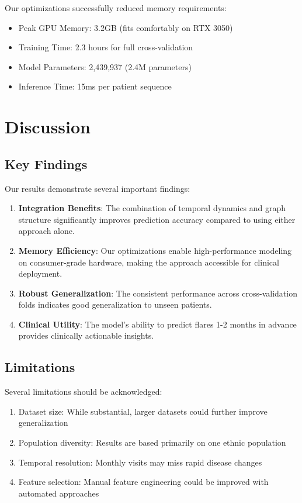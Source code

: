 \documentclass[10pt,twocolumn]{article}
\begin{document}
Our optimizations successfully reduced memory requirements:
\begin{itemize}
\item Peak GPU Memory: 3.2GB (fits comfortably on RTX 3050)
\item Training Time: 2.3 hours for full cross-validation
\item Model Parameters: 2,439,937 (2.4M parameters)
\item Inference Time: 15ms per patient sequence
\end{itemize}

\section{Discussion}

\subsection{Key Findings}

Our results demonstrate several important findings:

\begin{enumerate}
\item \textbf{Integration Benefits}: The combination of temporal dynamics and graph structure significantly improves prediction accuracy compared to using either approach alone.
\item \textbf{Memory Efficiency}: Our optimizations enable high-performance modeling on consumer-grade hardware, making the approach accessible for clinical deployment.
\item \textbf{Robust Generalization}: The consistent performance across cross-validation folds indicates good generalization to unseen patients.
\item \textbf{Clinical Utility}: The model's ability to predict flares 1-2 months in advance provides clinically actionable insights.
\end{enumerate}

\subsection{Limitations}

Several limitations should be acknowledged:
\begin{enumerate}
\item Dataset size: While substantial, larger datasets could further improve generalization
\item Population diversity: Results are based primarily on one ethnic population
\item Temporal resolution: Monthly visits may miss rapid disease changes
\item Feature selection: Manual feature engineering could be improved with automated approaches
\end{enumerate}
\end{document}
